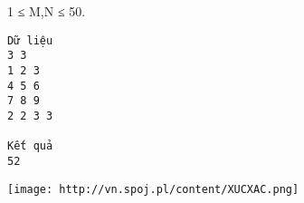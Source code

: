 1 ≤ M,N ≤ 50.
\begin{verbatim}
Dữ liệu
3 3
1 2 3
4 5 6
7 8 9
2 2 3 3

Kết quả
52
\end{verbatim}


\texttt{[image: http://vn.spoj.pl/content/XUCXAC.png]}